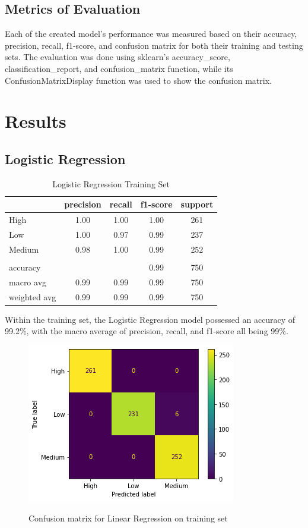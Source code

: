 \documentclass[runningheads]{llncs}
\begin{document}
\subsection{Metrics of Evaluation}
Each of the created model’s performance was measured based on their accuracy, precision, recall, f1-score, and confusion matrix for both their training and testing sets. The evaluation was done using sklearn’s accuracy\_score, classification\_report, and confusion\_matrix function, while its ConfusionMatrixDisplay function was used to show the confusion matrix.

\section{Results}

\subsection{Logistic Regression}

\begin{table}[ht]
\centering
\caption{Logistic Regression Training Set}
\begin{tabular}{|l|c|c|c|c|} \hline
 & precision & recall & f1-score & support \\ \hline
High   & 1.00 & 1.00 & 1.00 & 261 \\ \hline
Low    & 1.00 & 0.97 & 0.99 & 237 \\ \hline
Medium & 0.98 & 1.00 & 0.99 & 252 \\ \hline
& & & & \\ \hline
accuracy     & & & 0.99 & 750 \\ \hline
macro avg    & 0.99 & 0.99 & 0.99 & 750 \\ \hline
weighted avg & 0.99 & 0.99 & 0.99 & 750 \\ \hline
\end{tabular}
\label{tab:regression-training}
\end{table}

Within the training set, the Logistic Regression model possessed an accuracy of 99.2\%, with the macro average of precision, recall, and f1-score all being 99\%. 

\begin{figure}[H]           	 
\centering               	 
\caption{Confusion matrix for Linear Regression on training set}
\includegraphics[scale=0.5]{regression-CM-training.png}  	 
\label{fig:regression-CM-training}
\end{figure}
\end{document}
